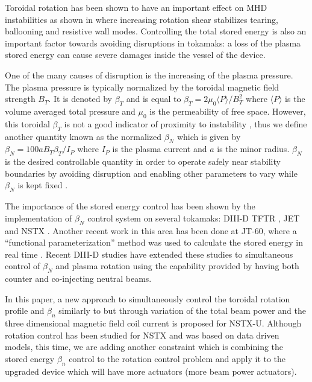 \documentclass[12pt,lot, lof]{puthesis}
\begin{document}
Toroidal rotation has been shown to have an important effect on MHD instabilities as shown in \cite{Gerhardt09, Park13, Sabbagh10, Berkery10, Garofalo02} where increasing rotation shear stabilizes tearing, ballooning and resistive wall modes.
Controlling the total stored energy is also an important factor towards avoiding disruptions in tokamaks: a loss of the plasma stored energy can cause severe damages inside the vessel of the device.

One of the many causes of disruption is the increasing of the plasma pressure. The plasma pressure is typically normalized by the toroidal magnetic field strength $B_T$. It is denoted by $\beta_T$ and is equal to $\beta_T = 2 \mu_0 \langle{P}\rangle / B_T^{2} $ where $\langle P \rangle$ is the volume averaged total pressure and $\mu_0$ is the permeability of free space. However, this toroidal $\beta_T$  is not a good indicator of proximity to instability \cite{Strait94}, thus we define another quantity known as the normalized $\beta_N$ which is given by $\beta_N = 100 a B_T \beta_T / I_P $ where $I_P$ is the plasma current and $a$ is the minor radius. $\beta_N$ is the desired controllable quantity in order to operate safely near stability boundaries by avoiding disruption and enabling other parameters to vary while $\beta_N$ is kept fixed \cite{Gerhardt12}.

The importance of the stored energy control has been shown by the implementation of $\beta_N$ control system on several tokamaks: DIII-D \cite{Campbell92} TFTR \cite{Lawson95}, JET \cite{Zornig96} and NSTX \cite{Gerhardt11, Gerhardt12}. 
Another recent work in this area has been done at JT-60, where a “functional parameterization” method was used to calculate the stored energy in real time \cite{Oikawa04}. Recent DIII-D studies \cite{Scoville07} have extended these studies to simultaneous control of $\beta_N$ and plasma rotation using the capability provided by having both counter and co-injecting neutral beams.

In this paper, a new approach to simultaneously control the toroidal rotation profile and $\beta_n$ similarly to \cite{Scoville07} but through variation of the total beam power and the three dimensional magnetic field coil current is proposed for NSTX-U. Although rotation control has been studied for NSTX \cite{Goumiri15} and was based on data driven models, this time, we are adding another constraint which is  combining the  stored energy  $\beta_n$ control to the rotation control problem and apply it to the upgraded device which will have more actuators (more beam power actuators).
\end{document}
